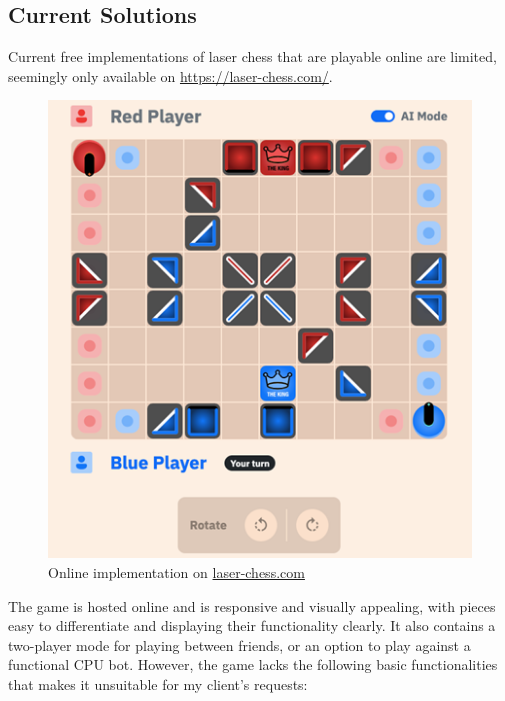 \documentclass[../main/main.tex]{subfiles}
\begin{document}
\subsection{Current Solutions}
Current free implementations of laser chess that are playable online are limited, seemingly only available on \url{https://laser-chess.com/}.

\begin{figure}[H]
    \centering
    \includegraphics[width=0.6\columnwidth]{../analysis/assets/laser_chess_com.png}
    \caption{Online implementation on \href{https://laser-chess.com/}{laser-chess.com}}
    \label{fig:laser-chess-com}
\end{figure}

The game is hosted online and is responsive and visually appealing, with pieces easy to differentiate and displaying their functionality clearly. It also contains a two-player mode for playing between friends, or an option to play against a functional CPU bot. However, the game lacks the following basic functionalities that makes it unsuitable for my client’s requests:
\end{document}
